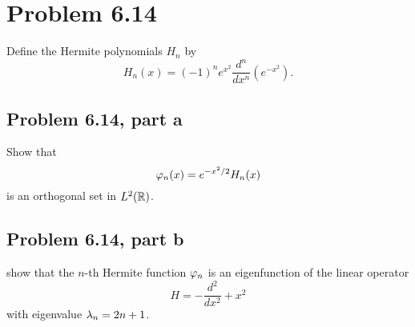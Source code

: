 \newpage
\section{Problem 6.14}
Define the Hermite polynomials $H_n$ by 
\[H_n(x) = (-1)^ne^{x^2} \frac{d^n}{dx^n}\left( e^{-x^2}\right).\]
\subsection{Problem 6.14, part a}
Show that 
\[\varphi_n(x)  = e^{-x^2/2}H_n(x)\]
is an orthogonal set in $L^2(\mathbb{R})$.

\newpage
\subsection{Problem 6.14, part b}
show that the $n$-th Hermite function $\varphi_n$ is an eigenfunction of the linear operator
\[H = -\frac{d^2}{dx^2} + x^2\]
with eigenvalue $\mathrm{\lambda}_n = 2n+1$.
